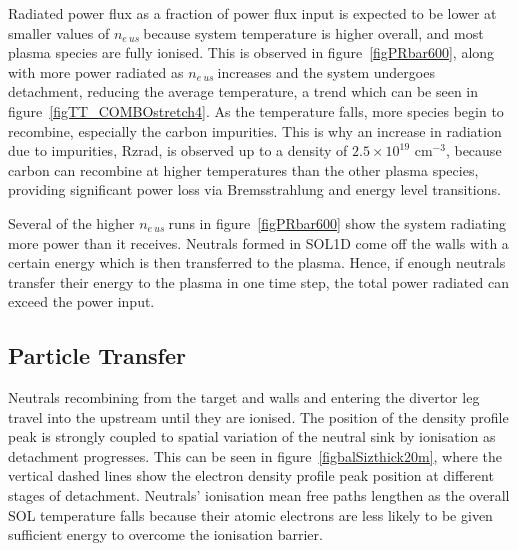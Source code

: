 \documentclass[12pt]{article}  %
\providecommand{\noNe}[1]{{${#1}\times 10^{19}$ cm$^{-3}$}} %
\providecommand{\neus}{$n_{e~us}~$} %
\begin{document}
Radiated power flux as a fraction of power flux input is expected to be lower at smaller values of \neus because system temperature is higher overall, and most plasma species are fully ionised. This is observed in figure~\ref{figPRbar600}, along with more power radiated as \neus increases and the system undergoes detachment, reducing the average temperature, a trend which can be seen in figure~\ref{figTT_COMBOstretch4}. As the temperature falls, more species begin to recombine, especially the carbon impurities. This is why an increase in radiation due to impurities, Rzrad, is observed up to a density of \noNe{2.5}, because carbon can recombine at higher temperatures than the other plasma species, providing significant power loss via Bremsstrahlung and energy level transitions.

Several of the higher \neus runs in figure~\ref{figPRbar600} show the system radiating more power than it receives. Neutrals formed in SOL1D come off the walls with a certain energy which is then transferred to the plasma. Hence, if enough neutrals transfer their energy to the plasma in one time step, the total power radiated can exceed the power input.


\subsection{Particle Transfer}\label{ssecPtrans}
Neutrals recombining from the target and walls and entering the divertor leg travel into the upstream until they are ionised. The position of the density profile peak is strongly coupled to spatial variation of the neutral sink by ionisation as detachment progresses. This can be seen in figure~\ref{figbalSizthick20m}, where the vertical dashed lines show the electron density profile peak position at different stages of detachment. Neutrals' ionisation mean free paths lengthen as the overall SOL temperature falls because their atomic electrons are less likely to be given sufficient energy to overcome the ionisation barrier.
\end{document}
